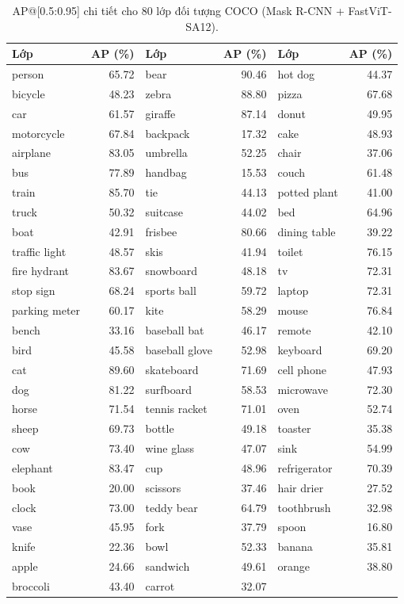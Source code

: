 \begin{table}[H]
\centering
\caption{AP@[0.5:0.95] chi tiết cho 80 lớp đối tượng COCO (Mask R-CNN + FastViT-SA12).}
\label{tab:coco_per_class}
\small
\begin{tabular}{l r | l r | l r}
\toprule
\textbf{Lớp} & \textbf{AP (\%)} & \textbf{Lớp} & \textbf{AP (\%)} & \textbf{Lớp} & \textbf{AP (\%)} \\
\midrule
person & 65.72 & bear & 90.46 & hot dog & 44.37 \\
bicycle & 48.23 & zebra & 88.80 & pizza & 67.68 \\
car & 61.57 & giraffe & 87.14 & donut & 49.95 \\
motorcycle & 67.84 & backpack & 17.32 & cake & 48.93 \\
airplane & 83.05 & umbrella & 52.25 & chair & 37.06 \\
bus & 77.89 & handbag & 15.53 & couch & 61.48 \\
train & 85.70 & tie & 44.13 & potted plant & 41.00 \\
truck & 50.32 & suitcase & 44.02 & bed & 64.96 \\
boat & 42.91 & frisbee & 80.66 & dining table & 39.22 \\
traffic light & 48.57 & skis & 41.94 & toilet & 76.15 \\
fire hydrant & 83.67 & snowboard & 48.18 & tv & 72.31 \\
stop sign & 68.24 & sports ball & 59.72 & laptop & 72.31 \\
parking meter & 60.17 & kite & 58.29 & mouse & 76.84 \\
bench & 33.16 & baseball bat & 46.17 & remote & 42.10 \\
bird & 45.58 & baseball glove & 52.98 & keyboard & 69.20 \\
cat & 89.60 & skateboard & 71.69 & cell phone & 47.93 \\
dog & 81.22 & surfboard & 58.53 & microwave & 72.30 \\
horse & 71.54 & tennis racket & 71.01 & oven & 52.74 \\
sheep & 69.73 & bottle & 49.18 & toaster & 35.38 \\
cow & 73.40 & wine glass & 47.07 & sink & 54.99 \\
elephant & 83.47 & cup & 48.96 & refrigerator & 70.39 \\
\midrule
book & 20.00 & scissors & 37.46 & hair drier & 27.52 \\
clock & 73.00 & teddy bear & 64.79 & toothbrush & 32.98 \\
vase & 45.95 & fork & 37.79 & spoon & 16.80 \\
knife & 22.36 & bowl & 52.33 & banana & 35.81 \\
apple & 24.66 & sandwich & 49.61 & orange & 38.80 \\
broccoli & 43.40 & carrot & 32.07 & & \\
\bottomrule
\end{tabular}
\end{table}

